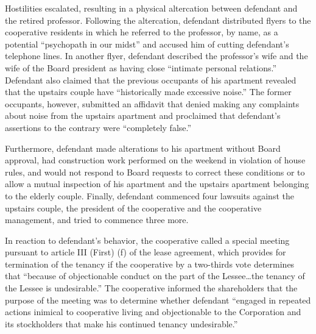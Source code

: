 Hostilities escalated, resulting in a physical altercation between defendant and
the retired professor. Following the altercation, defendant
distributed flyers to the cooperative residents in which he referred to the
professor, by name, as a potential ``psychopath in our midst'' and accused him
of cutting defendant's telephone lines. In another flyer, defendant described
the professor's wife and the wife of the Board president as having close
``intimate personal relations.'' Defendant also claimed that the previous
occupants of his apartment revealed that the upstairs couple have ``historically
made excessive noise.'' The former occupants, however, submitted an affidavit
that denied making any complaints about noise from the upstairs apartment and
proclaimed that defendant's assertions to the contrary were ``completely
false.''

Furthermore, defendant made alterations to his apartment without Board approval,
had construction work performed on the weekend in violation of house rules, and
would not respond to Board requests to correct these conditions or to allow a
mutual inspection of his apartment and the upstairs apartment belonging to the
elderly couple. Finally, defendant commenced four lawsuits against the upstairs
couple, the president of the cooperative and the cooperative management, and
tried to commence three more.

In reaction to defendant's behavior, the cooperative called a special meeting
pursuant to article III (First) (f) of the lease agreement, which provides for
termination of the tenancy if the cooperative by a two-thirds vote determines
that ``because of objectionable conduct on the part of the Lessee\ldots the
tenancy of the Lessee is undesirable.'' The cooperative informed the shareholders that the purpose of
the meeting was to determine whether defendant ``engaged in repeated actions
inimical to cooperative living and objectionable to the Corporation and its
stockholders that make his continued tenancy undesirable.''

